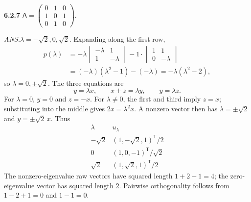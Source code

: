 \par\bigskip
\noindent\textbf{6.2.7}\quad
$\mathsf{A}=\begin{pmatrix}0&1&0\\1&0&1\\0&1&0\end{pmatrix}$.
\par\nobreak\hfill\emph{ANS.}\enspace $\lambda=-\sqrt{2},0,\sqrt{2}$.
\solution
Expanding along the first row,
\begin{align*}
p(\lambda)
&=-\lambda\begin{vmatrix}-\lambda&1\\1&-\lambda\end{vmatrix}
-1\cdot\begin{vmatrix}1&1\\0&-\lambda\end{vmatrix}\\
&=(-\lambda)(\lambda^2-1)-(-\lambda)
=-\lambda(\lambda^2-2),
\end{align*}
so $\lambda=0,\pm\sqrt2$. The three equations are
\[
y=\lambda x,\qquad x+z=\lambda y,\qquad y=\lambda z.
\]
For $\lambda=0$, $y=0$ and $z=-x$.
For $\lambda\ne0$, the first and third imply $z=x$; substituting into
the middle gives $2x=\lambda^2x$. A nonzero vector then has
$\lambda=\pm\sqrt2$ and $y=\pm\sqrt2\,x$. Thus
\[
\boxed{\begin{array}{c|c}
\lambda&u_\lambda\\\hline
-\sqrt2&(1,-\sqrt2,1)^{\mathsf T}/2\\
0&(1,0,-1)^{\mathsf T}/\sqrt2\\
\sqrt2&(1,\sqrt2,1)^{\mathsf T}/2
\end{array}}
\]
The nonzero-eigenvalue raw vectors have squared length $1+2+1=4$;
the zero-eigenvalue vector has squared length $2$. Pairwise orthogonality
follows from $1-2+1=0$ and $1-1=0$.


